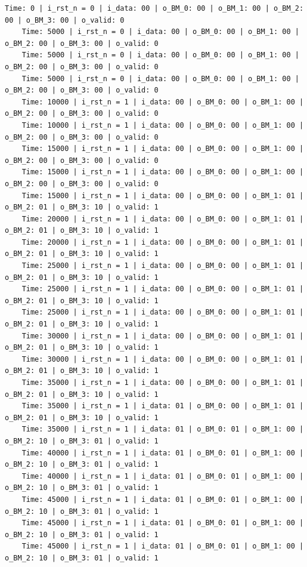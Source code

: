\begin{lstlisting}[style=StyleResult, language=Result]
	Time: 0 | i_rst_n = 0 | i_data: 00 | o_BM_0: 00 | o_BM_1: 00 | o_BM_2: 00 | o_BM_3: 00 | o_valid: 0
	Time: 5000 | i_rst_n = 0 | i_data: 00 | o_BM_0: 00 | o_BM_1: 00 | o_BM_2: 00 | o_BM_3: 00 | o_valid: 0
	Time: 5000 | i_rst_n = 0 | i_data: 00 | o_BM_0: 00 | o_BM_1: 00 | o_BM_2: 00 | o_BM_3: 00 | o_valid: 0
	Time: 5000 | i_rst_n = 0 | i_data: 00 | o_BM_0: 00 | o_BM_1: 00 | o_BM_2: 00 | o_BM_3: 00 | o_valid: 0
	Time: 10000 | i_rst_n = 1 | i_data: 00 | o_BM_0: 00 | o_BM_1: 00 | o_BM_2: 00 | o_BM_3: 00 | o_valid: 0
	Time: 10000 | i_rst_n = 1 | i_data: 00 | o_BM_0: 00 | o_BM_1: 00 | o_BM_2: 00 | o_BM_3: 00 | o_valid: 0
	Time: 15000 | i_rst_n = 1 | i_data: 00 | o_BM_0: 00 | o_BM_1: 00 | o_BM_2: 00 | o_BM_3: 00 | o_valid: 0
	Time: 15000 | i_rst_n = 1 | i_data: 00 | o_BM_0: 00 | o_BM_1: 00 | o_BM_2: 00 | o_BM_3: 00 | o_valid: 0
	Time: 15000 | i_rst_n = 1 | i_data: 00 | o_BM_0: 00 | o_BM_1: 01 | o_BM_2: 01 | o_BM_3: 10 | o_valid: 1
	Time: 20000 | i_rst_n = 1 | i_data: 00 | o_BM_0: 00 | o_BM_1: 01 | o_BM_2: 01 | o_BM_3: 10 | o_valid: 1
	Time: 20000 | i_rst_n = 1 | i_data: 00 | o_BM_0: 00 | o_BM_1: 01 | o_BM_2: 01 | o_BM_3: 10 | o_valid: 1
	Time: 25000 | i_rst_n = 1 | i_data: 00 | o_BM_0: 00 | o_BM_1: 01 | o_BM_2: 01 | o_BM_3: 10 | o_valid: 1
	Time: 25000 | i_rst_n = 1 | i_data: 00 | o_BM_0: 00 | o_BM_1: 01 | o_BM_2: 01 | o_BM_3: 10 | o_valid: 1
	Time: 25000 | i_rst_n = 1 | i_data: 00 | o_BM_0: 00 | o_BM_1: 01 | o_BM_2: 01 | o_BM_3: 10 | o_valid: 1
	Time: 30000 | i_rst_n = 1 | i_data: 00 | o_BM_0: 00 | o_BM_1: 01 | o_BM_2: 01 | o_BM_3: 10 | o_valid: 1
	Time: 30000 | i_rst_n = 1 | i_data: 00 | o_BM_0: 00 | o_BM_1: 01 | o_BM_2: 01 | o_BM_3: 10 | o_valid: 1
	Time: 35000 | i_rst_n = 1 | i_data: 00 | o_BM_0: 00 | o_BM_1: 01 | o_BM_2: 01 | o_BM_3: 10 | o_valid: 1
	Time: 35000 | i_rst_n = 1 | i_data: 01 | o_BM_0: 00 | o_BM_1: 01 | o_BM_2: 01 | o_BM_3: 10 | o_valid: 1
	Time: 35000 | i_rst_n = 1 | i_data: 01 | o_BM_0: 01 | o_BM_1: 00 | o_BM_2: 10 | o_BM_3: 01 | o_valid: 1
	Time: 40000 | i_rst_n = 1 | i_data: 01 | o_BM_0: 01 | o_BM_1: 00 | o_BM_2: 10 | o_BM_3: 01 | o_valid: 1
	Time: 40000 | i_rst_n = 1 | i_data: 01 | o_BM_0: 01 | o_BM_1: 00 | o_BM_2: 10 | o_BM_3: 01 | o_valid: 1
	Time: 45000 | i_rst_n = 1 | i_data: 01 | o_BM_0: 01 | o_BM_1: 00 | o_BM_2: 10 | o_BM_3: 01 | o_valid: 1
	Time: 45000 | i_rst_n = 1 | i_data: 01 | o_BM_0: 01 | o_BM_1: 00 | o_BM_2: 10 | o_BM_3: 01 | o_valid: 1
	Time: 45000 | i_rst_n = 1 | i_data: 01 | o_BM_0: 01 | o_BM_1: 00 | o_BM_2: 10 | o_BM_3: 01 | o_valid: 1

\end{lstlisting}
